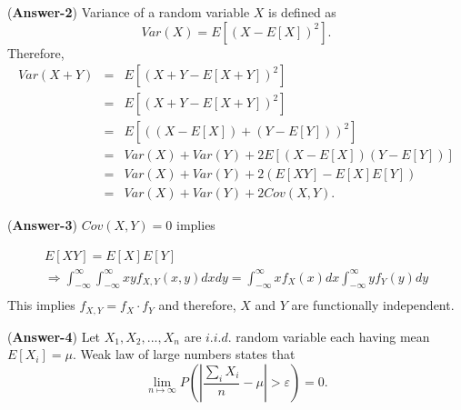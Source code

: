 \documentclass[11pt,twoside,reqno]{article}
\begin{document}
({\bf Answer-2}) Variance of a random variable $X$ is defined as 
\[
Var(X) = E[(X-E[X])^2].
\]
Therefore,
\begin{eqnarray*}
Var(X + Y) &=&  E[(X + Y -E[X + Y])^2] \\
&=&  E[(X + Y -E[X + Y])^2] \\
&=& E[ ((X -E[X]) + (Y - E[Y]))^2] \\
&=& Var(X) + Var(Y) + 2 E[(X -E[X])(Y - E[Y])]\\
&=& Var(X) + Var(Y) + 2(E[XY] - E[X]E[Y]) \\
&=& Var(X) + Var(Y) + 2Cov(X,Y).
\end{eqnarray*}


({\bf Answer-3}) $Cov(X,Y) = 0$ implies 

\begin{eqnarray*}
E[XY] = E[X]E[Y] \\
\Rightarrow \int_{-\infty}^{\infty}\int_{-\infty}^{\infty}xy f_{X,Y}(x,y)dxdy = \int_{-\infty}^{\infty}x f_X(x)dx\int_{-\infty}^{\infty}y f_Y(y)dy\\
\end{eqnarray*}
This implies $f_{X,Y} = f_{X}\cdot f_{Y}$ and therefore, $X$ and $Y$ are functionally independent.  

({\bf Answer-4}) Let $X_1, X_2, ..., X_n$ are $i.i.d.$ random variable each having mean $E[X_i] = \mu$. Weak law of large numbers states that
\[
\lim\limits_{n\mapsto \infty} P\left(\left|\frac{\sum_{i}X_i}{n} -\mu\right| > \varepsilon \right) = 0.
\]
\end{document}
